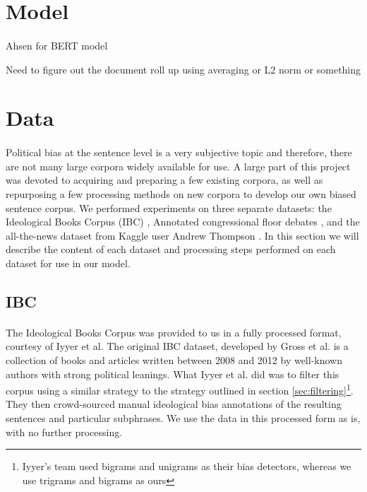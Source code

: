 \documentclass[10pt,a4paper,onecolumn]{article}
\begin{document}
\section{Model}
\paragraph{}
Ahsen for BERT model

Need to figure out the document roll up using averaging or L2 norm or something

\section{Data}
\label{sec:data}
\paragraph{}
Political bias at the sentence level is a very subjective topic and therefore, there are not many large corpora widely available for use. A large part of this project was devoted to acquiring and preparing a few existing corpora, as well as repurposing a few processing methods on new corpora to develop our own biased sentence corpus. We performed experiments on three separate datasets: the Ideological Books Corpus (IBC) \cite{iyyerRNN}, Annotated congressional floor debates \cite{convote}, and the all-the-news dataset from Kaggle user Andrew Thompson \cite{news}. In this section we will describe the content of each dataset and processing steps performed on each dataset for use in our model.

\subsection{IBC}
\paragraph{}
The Ideological Books Corpus was provided to us in a fully processed format, courtesy of Iyyer et al.\cite{iyyerRNN} The original IBC dataset, developed by Gross et al.\cite{gross2013ibc} is a collection of books and articles written between 2008 and 2012 by well-known authors with strong political leanings. What Iyyer et al. did was to filter this corpus using a similar strategy to the strategy outlined in section \ref{sec:filtering}\footnote{Iyyer's team used bigrams and unigrams as their bias detectors, whereas we use trigrams and bigrams as ours}. They then crowd-sourced manual ideological bias annotations of the resulting sentences and particular subphrases. We use the data in this processed form as is, with no further processing.
\end{document}
